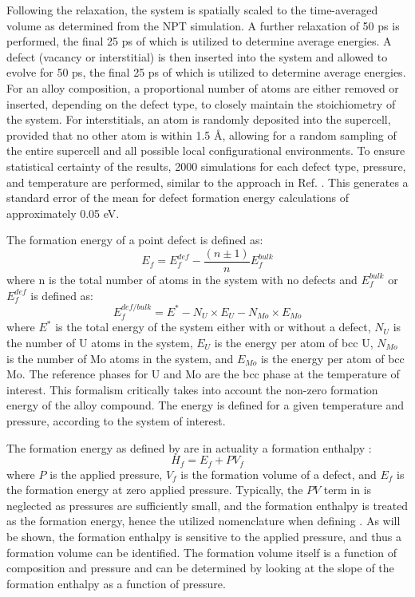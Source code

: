\documentclass[review]{elsarticle}
\begin{document}
Following the relaxation, the system is spatially scaled to the time-averaged volume as determined from the NPT simulation. A further relaxation of 50 ps is performed, the final 25 ps of which is utilized to determine average energies. A defect (vacancy or interstitial) is then inserted into the system and allowed to evolve for 50 ps, the final 25 ps of which is utilized to determine average energies. For an alloy composition, a proportional number of atoms are either removed or inserted, depending on the defect type, to closely maintain the stoichiometry of the system. For interstitials, an atom is randomly deposited into the supercell, provided that no other atom is within 1.5 \r{A}, allowing for a random sampling of the entire supercell and all possible local configurational environments. To ensure statistical certainty of the results, 2000 simulations for each defect type, pressure, and temperature are performed, similar to the approach in Ref. \cite{zhang2021}. This generates a standard error of the mean for defect formation energy calculations of approximately 0.05 eV.

The formation energy of a point defect is defined as:
\begin{equation}\label{eq:eform1}
 E_f = E_f^{def} - \frac{(n\pm1)}{n}E_f^{bulk}
\end{equation}
\noindent where n is the total number of atoms in the system with no defects and $E_f^{bulk}$ or $E_f^{def}$ is defined as:
\begin{equation}\label{eq:eform2}
E_f^{def/bulk} = E^* - N_U \times E_U - N_{Mo} \times E_{Mo}
\end{equation}
\noindent where $E^*$ is the total energy of the system either with or without a defect, $N_U$ is the number of U atoms in the system, $E_U$ is the energy per atom of bcc U, $N_{Mo}$ is the number of Mo atoms in the system, and $E_{Mo}$ is the energy per atom of bcc Mo. The reference phases for U and Mo are the bcc phase at the temperature of interest. This formalism critically takes into account the non-zero formation energy of the alloy compound. The energy is defined for a given temperature and pressure, according to the system of interest. 

The formation energy as defined by  are in actuality a formation enthalpy \cite{kraftmakher1998}:
\begin{equation}\label{eq:enthalpy}
 H_f = E_f + PV_f 
\end{equation}
\noindent where $P$ is the applied pressure, $V_f$ is the formation volume of a defect, and $E_f$ is the formation energy at zero applied pressure. Typically, the $PV$ term in  is neglected as pressures are sufficiently small, and the formation enthalpy is treated as the formation energy, hence the utilized nomenclature when defining . As will be shown, the formation enthalpy is sensitive to the applied pressure, and thus a formation volume can be identified. The formation volume itself is a function of composition and pressure and can be determined by looking at the slope of the formation enthalpy as a function of pressure. 
\end{document}
